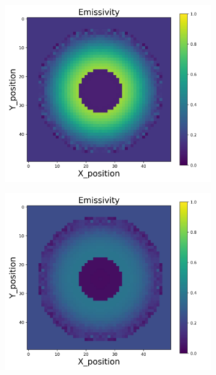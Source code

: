 {\begin{figure}[p]
\begin{minipage}{\textwidth}
\begin{subfigure}{0.325\textwidth}
        \end{subfigure}
        \begin{subfigure}{0.325\textwidth}
            \centering
            \includegraphics[width=\textwidth]{figures/raw_data/23/mix/emi_cal.jpg}
        \end{subfigure}
        \begin{subfigure}{0.325\textwidth}
            \centering
            \includegraphics[width=\textwidth]{figures/raw_data/24/mix/emi_cal.jpg}

\end{subfigure}
\end{minipage}
\end{figure}}
